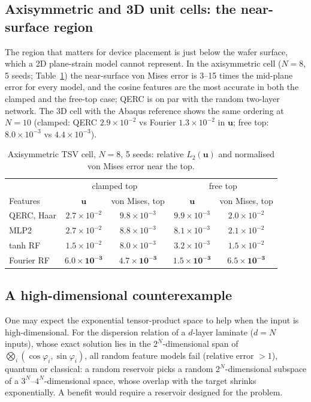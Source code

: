 \documentclass[11pt]{article}
\theoremstyle{remark}\newtheorem*{remark}{Remark}
\begin{document}
\subsection{Axisymmetric and 3D unit cells: the near-surface region}
The region that matters for device placement is just below the wafer surface, which a 2D plane-strain model cannot
represent. In the axisymmetric cell ($N=8$, 5 seeds; Table~\ref{tab:axisym}) the near-surface von Mises error is
3--15 times the mid-plane error for every model, and the cosine features are the most accurate in both the clamped
and the free-top case; QERC is on par with the random two-layer network. The 3D cell with the Abaqus reference shows
the same ordering at $N=10$ (clamped: QERC $2.9\times10^{-2}$ vs Fourier $1.3\times10^{-2}$ in $\bm u$; free top:
$8.0\times10^{-3}$ vs $4.4\times10^{-3}$).

\begin{table}[t]
  \centering
  \caption{Axisymmetric TSV cell, $N=8$, 5 seeds: relative $L_2(\bm u)$ and normalised von Mises error near the top.}
  \label{tab:axisym}
  \begin{tabular}{lcccc}
    \toprule
    & \multicolumn{2}{c}{clamped top} & \multicolumn{2}{c}{free top} \\
    Features & $\bm u$ & von Mises, top & $\bm u$ & von Mises, top \\
    \midrule
    QERC, Haar & $2.7\times10^{-2}$ & $9.8\times10^{-3}$ & $9.9\times10^{-3}$ & $2.0\times10^{-2}$ \\
    MLP2       & $2.7\times10^{-2}$ & $8.8\times10^{-3}$ & $8.1\times10^{-3}$ & $2.1\times10^{-2}$ \\
    tanh RF    & $1.5\times10^{-2}$ & $8.0\times10^{-3}$ & $3.2\times10^{-3}$ & $1.5\times10^{-2}$ \\
    Fourier RF & $\bm{6.0\times10^{-3}}$ & $\bm{4.7\times10^{-3}}$ & $\bm{1.5\times10^{-3}}$ & $\bm{6.5\times10^{-3}}$ \\
    \bottomrule
  \end{tabular}
\end{table}

\subsection{A high-dimensional counterexample}
One may expect the exponential tensor-product space to help when the input is high-dimensional.
For the dispersion relation of a $d$-layer laminate ($d=N$ inputs), whose exact solution lies in the $2^N$-dimensional
span of $\bigotimes_i(\cos\varphi_i,\sin\varphi_i)$, all random feature models fail (relative error $>1$), quantum
or classical: a random reservoir picks a random $2^N$-dimensional subspace of a $3^N$--$4^N$-dimensional space, whose
overlap with the target shrinks exponentially. A benefit would require a reservoir designed for the problem.
\end{document}
